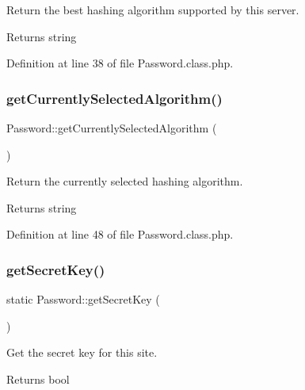 Return the best hashing algorithm supported by this server. 

\begin{DoxyReturn}{Returns}
string 
\end{DoxyReturn}


Definition at line 38 of file Password.\+class.\+php.

\mbox{\label{classPassword_afd4c3a1daf246f73845a1f0c60cd17d8}} 
\subsubsection{\texorpdfstring{get\+Currently\+Selected\+Algorithm()}{getCurrentlySelectedAlgorithm()}}
{\footnotesize\ttfamily Password\+::get\+Currently\+Selected\+Algorithm (\begin{DoxyParamCaption}{ }\end{DoxyParamCaption})}



Return the currently selected hashing algorithm. 

\begin{DoxyReturn}{Returns}
string 
\end{DoxyReturn}


Definition at line 48 of file Password.\+class.\+php.

\mbox{\label{classPassword_a34c9775ddb1701f8b136f872559c0fcc}} 
\subsubsection{\texorpdfstring{get\+Secret\+Key()}{getSecretKey()}}
{\footnotesize\ttfamily static Password\+::get\+Secret\+Key (\begin{DoxyParamCaption}{ }\end{DoxyParamCaption})\hspace{0.3cm}{\ttfamily [static]}}



Get the secret key for this site. 

\begin{DoxyReturn}{Returns}
bool 
\end{DoxyReturn}


